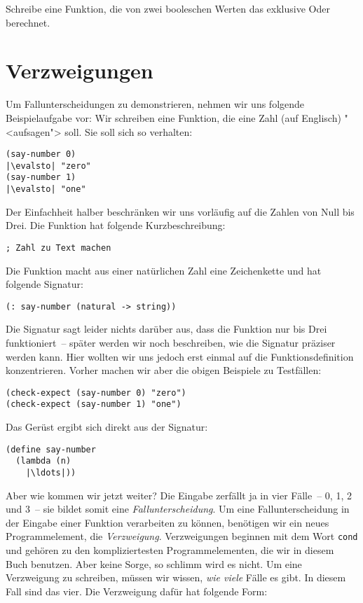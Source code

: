 \begin{aufgabeinline}
  Schreibe eine Funktion, die von zwei booleschen Werten das exklusive
  Oder berechnet. 
\end{aufgabeinline}

\section{Verzweigungen}

Um Fallunterscheidungen zu demonstrieren, nehmen wir uns folgende
Beispielaufgabe vor: Wir schreiben eine Funktion, die eine Zahl (auf
Englisch) "<aufsagen"> soll.  Sie soll sich so verhalten:
%
\begin{lstlisting}
(say-number 0)
|\evalsto| "zero"
(say-number 1)
|\evalsto| "one"
\end{lstlisting}
%
Der Einfachheit halber beschränken wir uns vorläufig auf die Zahlen
von Null bis Drei.  Die Funktion hat folgende Kurzbeschreibung:
%
\begin{lstlisting}
; Zahl zu Text machen
\end{lstlisting}
%
Die Funktion macht aus einer natürlichen Zahl eine Zeichenkette und
hat folgende Signatur:
%
\begin{lstlisting}
(: say-number (natural -> string))
\end{lstlisting}
%
Die Signatur sagt leider nichts darüber aus, dass die Funktion nur bis
Drei funktioniert~-- später werden wir noch beschreiben, wie die
Signatur präziser werden kann.  Hier wollten wir uns jedoch erst
einmal auf die Funktionsdefinition konzentrieren.  Vorher machen wir
aber die obigen Beispiele zu Testfällen:
%
\begin{lstlisting}
(check-expect (say-number 0) "zero")
(check-expect (say-number 1) "one")
\end{lstlisting}
%
Das Gerüst ergibt sich direkt aus der Signatur:
%
\begin{lstlisting}
(define say-number
  (lambda (n)
    |\ldots|))
\end{lstlisting}
%
Aber wie kommen wir jetzt weiter?  Die Eingabe zerfällt ja in vier
Fälle~-- 0, 1, 2 und 3~-- sie bildet somit eine
\textit{Fallunterscheidung}.  Um eine
Fallunterscheidung in der Eingabe einer Funktion verarbeiten zu können,
benötigen wir ein neues Programmelement, die
\textit{Verzweigung}.  Verzweigungen beginnen mit
dem Wort \lstinline{cond} und gehören zu den kompliziertesten
Programmelementen, die wir in diesem Buch benutzen.  Aber keine Sorge,
so schlimm wird es nicht.  Um eine Verzweigung zu schreiben, müssen
wir wissen, \emph{wie viele} Fälle es gibt.  In diesem Fall sind das
vier.  Die Verzweigung dafür hat folgende Form:
%

